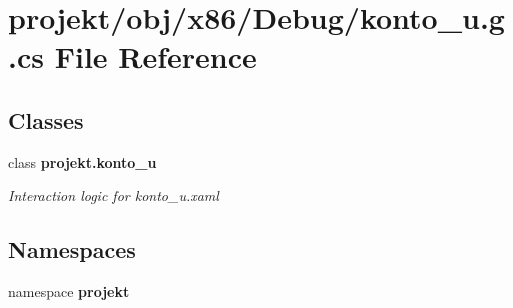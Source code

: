 \section{projekt/obj/x86/\+Debug/konto\+\_\+u.g.\+cs File Reference}
\label{x86_2Debug_2konto__u_8g_8cs}
\subsection*{Classes}
\begin{DoxyCompactItemize}
\item 
class \textbf{ projekt.\+konto\+\_\+u}
\begin{DoxyCompactList}\small\item\em Interaction logic for konto\+\_\+u.\+xaml \end{DoxyCompactList}\end{DoxyCompactItemize}
\subsection*{Namespaces}
\begin{DoxyCompactItemize}
\item 
namespace \textbf{ projekt}
\end{DoxyCompactItemize}
